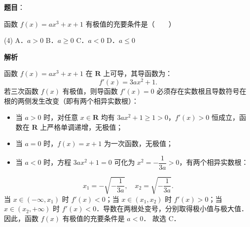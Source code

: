\begin{answer}

\textbf{题目}：

函数 $f(x) = ax^3 + x + 1$ 有极值的充要条件是\mbox{（　　）}

\begin{gkopts}(4)
\task A．$a > 0$
\task B．$a \geqslant 0$
\task C．$a < 0$
\task D．$a \leqslant 0$
\end{gkopts}

\textbf{解析}

函数 $f(x) = ax^3 + x + 1$ 在 $\mathbf{R}$ 上可导，其导函数为：
\nopagebreak[4]
\[
f'(x) = 3ax^2 + 1.
\]
若三次函数 $f(x)$ 有极值，则导函数 $f'(x) = 0$ 必须存在实数根且导数符号在根的两侧发生改变（即有两个相异实数根）：
\begin{itemize}
\item 当 $a > 0$ 时，对任意 $x \in \mathbf{R}$ 均有 $3ax^2 + 1 \geqslant 1 > 0$，$f'(x) > 0$ 恒成立，函数在 $\mathbf{R}$ 上严格单调递增，无极值；
\item 当 $a = 0$ 时，$f(x) = x + 1$ 为一次函数，无极值；
\item 当 $a < 0$ 时，方程 $3ax^2 + 1 = 0$ 可化为 $x^2 = -\dfrac{1}{3a} > 0$，有两个相异实数根：
\end{itemize}
\nopagebreak[4]
\[
x_1 = -\sqrt{-\frac{1}{3a}}, \quad x_2 = \sqrt{-\frac{1}{3a}}.
\]
  当 $x \in (-\infty, x_1)$ 时 $f'(x) < 0$；当 $x \in (x_1, x_2)$ 时 $f'(x) > 0$；当 $x \in (x_2, +\infty)$ 时 $f'(x) < 0$．导数在两根处变号，分别取得极小值与极大值．
因此，函数 $f(x)$ 有极值的充要条件是 $a < 0$．
故选 C．


\end{answer}
